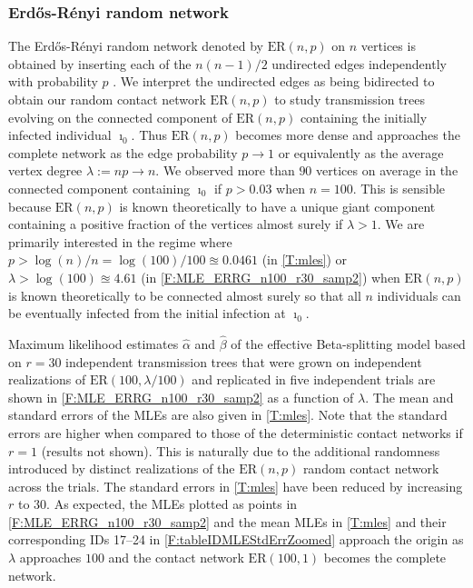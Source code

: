 \documentclass[review]{elsarticle}
\numberwithin{equation}{section}
\let\orgautoref\autoref
\renewcommand{\autoref}
        {\def\equationautorefname{Eq.}%
         \def\figureautorefname{Fig.}%
         \def\subfigureautorefname{Fig.}%
         \def\sectionautorefname{Sect.}%
         \def\subsectionautorefname{Sect.}%
         \def\subsubsectionautorefname{Sect.}%
         \def\Itemautorefname{item}%
         \def\tableautorefname{Table}%
         \def\propositionautorefname{Prop.}%
         \def\corollaryautorefname{Corollary}%
         \def\theoremautorefname{Theorem}%
         \def\remarkautorefname{Remark}%
         \def\lemmaautorefname{Lemma}%
         \def\proofofautorefname{Proof}%
         \def\exampleautorefname{Example}%
         \orgautoref}
\begin{document}
\subsubsection{Erd\H{o}s-R\'enyi random network}

The Erd\H{o}s-R\'enyi random network denoted by $\mathrm{ER}(n,p)$ on $n$ vertices is obtained by inserting each of the $n(n-1)/2$ undirected edges independently with probability $p$ \citep{Erdos1959,gilbert1959}.  
We interpret the undirected edges as being bidirected to obtain our random contact network $\mathrm{ER}(n,p)$ to study transmission trees evolving on the connected component of $\mathrm{ER}(n,p)$ containing the initially infected individual $\imath_0$.  
Thus $\mathrm{ER}(n,p)$ becomes more dense and approaches the complete network as the edge probability $p \to 1$ or equivalently as the average vertex degree $\lambda :=np \to n$.  
We observed more than $90$ vertices on average in the connected component containing $\imath_0$ if $p>0.03$ when $n=100$.  
This is sensible because $\mathrm{ER}(n,p)$ is known theoretically to have a unique giant component containing a positive fraction of the vertices almost surely if $\lambda>1$.  %
We are primarily interested in the regime where $p>\log(n)/n = \log(100)/100\approxeq 0.0461$ (in \autoref{T:mles}) or $\lambda>\log(100)\approxeq 4.61$ (in \autoref{F:MLE_ERRG_n100_r30_samp2}) when $\mathrm{ER}(n,p)$ is known theoretically to be connected almost surely so that all $n$ individuals can be eventually infected from the initial infection at $\imath_0$. 

Maximum likelihood estimates $\widehat{\alpha}$ and $\widehat{\beta}$ of the effective Beta-splitting model 
based on $r=30$ independent transmission trees that were grown on independent realizations of $\mathrm{ER}(100,\lambda/100)$ and replicated in five independent trials are shown in \autoref{F:MLE_ERRG_n100_r30_samp2} as a function of $\lambda$.   
The mean and standard errors of the MLEs are also given in \autoref{T:mles}.  
Note that the standard errors are higher when compared to those of the deterministic contact networks if $r=1$ (results not shown).  
This is naturally due to the additional randomness introduced by distinct realizations of the $\mathrm{ER}(n,p)$ random contact network across the trials.  
The standard errors in \autoref{T:mles} have been reduced by increasing $r$ to $30$.  
As expected, the MLEs plotted as points in \autoref{F:MLE_ERRG_n100_r30_samp2} and the mean MLEs in \autoref{T:mles} and their corresponding IDs 17--24 in \autoref{F:tableIDMLEStdErrZoomed} approach the origin as $\lambda$ approaches $100$ and the contact network $\mathrm{ER}(100,1)$ becomes the complete network.
\end{document}
